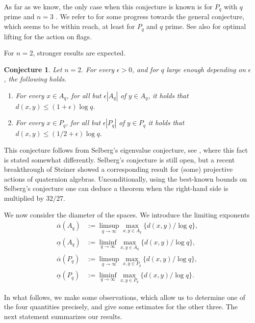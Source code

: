 \documentclass[12pt, a4paper]{amsart}
\numberwithin{equation}{section}
\newtheorem{conj}[theorem]{Conjecture}
\theoremstyle{definition}
\begin{document}
As far as we know, the only case when this conjecture is known is for $P_q$ with $q$ prime and $n=3$ \cite{kamber2023optimal}. We refer to \cite{blomer2023density,assing2022density,jana2022eisenstein-average} for some progress towards the general conjecture, which seems to be within reach, at least for $P_q$ and $q$ prime. See also \cite{assing2023density} for optimal lifting for the action on flags.

For $n=2$, stronger results are expected.
\begin{conj}\label{conj:schreier n2}
Let $n=2$. For every $\epsilon>0$, and for $q$ large enough depending on $\epsilon$, the following holds.
\begin{enumerate}
    \item For every $x\in A_q$, for all but $\epsilon|A_q|$ of $y\in A_q$, it holds that $d(x,y) \le (1+\epsilon)\log q$.
    \item For every $x\in P_q$, for all but $\epsilon|P_q|$ of $y\in P_q$ it holds that $d(x,y) \le (1/2+\epsilon)\log q$.
\end{enumerate}
\end{conj}

This conjecture follows from Selberg's eigenvalue conjecture, see \cite{golubev2019cutoff}, where this fact is stated somewhat differently. Selberg's conjecture is still open, but a recent breakthrough of Steiner \cite{steiner2023small} showed a corresponding result for (some) projective actions of quaternion algebras. Unconditionally, using the best-known bounds \cite{kim2003functoriality} on Selberg's conjecture one can deduce a theorem when the right-hand side is multiplied by $32/27$.

We now consider the diameter of the spaces. 
We introduce the limiting exponents
\begin{align*}
\overline{\alpha}(A_q) &:= \limsup_{q\to \infty} \max_{x,y\in A_q}\{d(x,y)/\log q\}, \\
\underline{\alpha}(A_q) &:= \liminf_{q\to \infty} \max_{x,y\in A_q}\{d(x,y)/\log q\}, \\
\overline{\alpha}(P_q) &:= \limsup_{q\to \infty} \max_{x,y\in P_q}\{d(x,y)/\log q\}, \\
\underline{\alpha}(P_q) &:= \liminf_{q\to \infty} \max_{x,y\in P_q}\{d(x,y)/\log q\}.
\end{align*}

In what follows, we make some observations, which allow us to determine one of the four
quantities precisely, and give some estimates for the other three.
The next statement summarizes our results.
\end{document}
